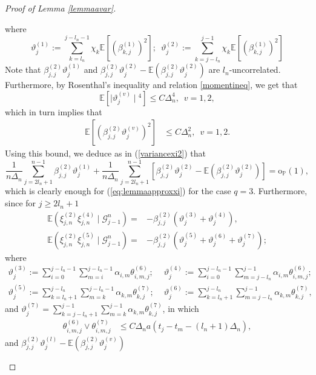 \documentclass{article}
\theoremstyle{plain}
\theoremstyle{definition}
\theoremstyle{remark}
\begin{document}
\begin{appendix}
\begin{proof}[Proof of Lemma \ref{lemmaavar}]
\begin{description}
		where 
		\[
		\vartheta_{j}^{(1)}:=\sum_{k=l_{n}}^{j-l_{n}-1}\chi_{k}\mathbb{E}[(\beta_{k,j}^{(1)})^{2}];\,\,\,\vartheta_{j}^{(2)}:=\sum_{k=j-l_{n}}^{j-1}\chi_{k}\mathbb{E}[(\beta_{k,j}^{(1)})^{2}]
		\]
		Note that $\beta_{j,j}^{(2)}\vartheta_{j}^{(1)}$ and $\beta_{j,j}^{(2)}\vartheta_{j}^{(2)}-\mathbb{E}(\beta_{j,j}^{(2)}\vartheta_{j}^{(2)})$
		are $l_{n}$-uncorrelated. Furthermore, by Rosenthal's inequality
		and relation \eqref{momentineq}, we get that 
		\[
		\mathbb{E}[\mid\vartheta_{j}^{(v)}\mid{}^{4}]\leq C\Delta_{n}^{4},\,\,\,v=1,2,
		\]
		which in turn implies that 
		\begin{align*}
			\mathbb{E}[(\beta_{j,j}^{(2)}\vartheta_{j}^{(v)})^{2}] & \leq C\Delta_{n}^{2},\,\,\,v=1,2.
		\end{align*}
		Using this bound, we deduce as in (\ref{variancexi2}) that 
		\[
		\frac{1}{n\Delta_{n}}\sum_{j=2l_{n}+1}^{n-1}\beta_{j,j}^{(2)}\vartheta_{j}^{(1)}+\frac{1}{n\Delta_{n}}\sum_{j=2l_{n}+1}^{n-1}\left[\beta_{j,j}^{(2)}\vartheta_{j}^{(2)}-\mathbb{E}(\beta_{j,j}^{(2)}\vartheta_{j}^{(2)})\right]=\mathrm{o}_{\mathbb{P}}(1),
		\]
		which is clearly enough for (\ref{eq:lemmaapproxxi}) for the case
		$q=3$. Furthermore, since for $j\geq2l_{n}+1$
		\begin{align*}
			\mathbb{E}(\xi_{j,n}^{(2)}\xi_{j,n}^{(4)}\mid\mathscr{G}_{j-1}^{n})= & -\beta_{j,j}^{(2)}(\vartheta_{j}^{(3)}+\vartheta_{j}^{(4)}),\\
			\mathbb{E}(\xi_{j,n}^{(2)}\xi_{j,n}^{(5)}\mid\mathscr{G}_{j-1}^{n})= & -\beta_{j,j}^{(2)}(\vartheta_{j}^{(5)}+\vartheta_{j}^{(6)}+\vartheta_{j}^{(7)});
		\end{align*}
		where 
		\begin{align*}
			\vartheta_{j}^{(3)}:=\sum_{i=0}^{j-l_{n}-1}\sum_{m=i}^{j-l_{n}-1}\alpha_{i,m}\theta_{i,m,j}^{(6)}; & \,\,\vartheta_{j}^{(4)}:=\sum_{i=0}^{j-l_{n}-1}\sum_{m=j-l_{n}}^{j-1}\alpha_{i,m}\theta_{i,m,j}^{(6)};\\
			\vartheta_{j}^{(5)}:=\sum_{k=l_{n}+1}^{j-l_{n}}\sum_{m=k}^{j-l_{n}-1}\alpha_{k,m}\theta_{k,j}^{(7)}; & \,\,\vartheta_{j}^{(6)}:=\sum_{k=l_{n}+1}^{j-l_{n}}\sum_{m=j-l_{n}}^{j-1}\alpha_{k,m}\theta_{k,j}^{(7)},
		\end{align*}
		and $\vartheta_{j}^{(7)}=\sum_{k=j-l_{n}+1}^{j-1}\sum_{m=k}^{j-1}\alpha_{k,m}\theta_{k,j}^{(7)}$,
		in which
		\begin{align*}
			\theta_{i,m,j}^{(6)}\lor\theta_{i,m,j}^{(7)} & \leq C\Delta_{n}a(t_{j}-t_{m}-(l_{n}+1)\Delta_{n}),
		\end{align*}
		and $\beta_{j,j}^{(2)}\vartheta_{j}^{(l)}-\mathbb{E}(\beta_{j,j}^{(2)}\vartheta_{j}^{(v)})$

\end{description}
\end{proof}
\end{appendix}
\end{document}
